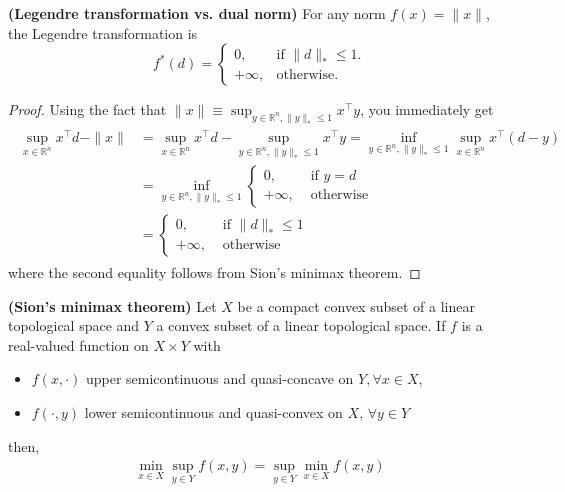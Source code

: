\documentclass{article}
\newcommand{\bfs}[1]{\textbf{({#1}) }}
\begin{document}
\begin{cora}\bfs{Legendre transformation vs. dual norm}\label{cor:nczeb}
For any norm $f(x) =\|x\|$,
the Legendre transformation  is 
\begin{equation}
  f^*(d)=\begin{cases}
    0, & \text{if $\|d\|_*\le 1$}.\\
    +\infty, & \text{otherwise}.
  \end{cases}
\end{equation}
\end{cora}
\begin{proof}\color{ForestGreen}
Using the fact that $\|x\| \equiv \sup _{y \in \mathbb{R}^{n},\|y\|_{*} \leq 1} x^{\top} y$, you immediately get
\begin{align*}
\begin{aligned}
\sup _{x \in \mathbb{R}^{n}} x^{\top} d-\|x\| &=\sup _{x \in \mathbb{R}^{n}} x^{\top} d-\sup _{y \in \mathbb{R}^{n},\|y\|_{*} \leq 1} x^{\top} y=\inf _{y \in \mathbb{R}^{n},\|y\|_{*} \leq 1} \sup _{x \in \mathbb{R}^{n}} x^{\top}(d-y) \\
&=\inf _{y \in \mathbb{R}^{n},\|y\|_{*} \leq 1} \begin{cases}0, & \text { if } y=d \\
+\infty, & \text { otherwise }\end{cases} \\
&= \begin{cases}0, & \text { if }\|d\|_{*} \leq 1 \\
+\infty, & \text { otherwise }\end{cases}
\end{aligned}
\end{align*}
where the second equality follows from Sion's minimax theorem.
\end{proof}
\begin{lema}\bfs{Sion's minimax theorem}\label{lem:guiozfc}
 Let $X$ be a compact convex subset of a linear topological space and $Y$ a convex subset of a linear topological space. If $f$ is a real-valued function on $X \times Y$ with
 \begin{itemize}
     \item $f(x, \cdot)$ upper semicontinuous and quasi-concave on $Y, \forall x \in X$, 
     \item $f(\cdot, y)$ lower semicontinuous and quasi-convex on $X$, $\forall y \in Y$
 \end{itemize}
then,
\begin{align*}
\min _{x \in X} \sup _{y \in Y} f(x, y)=\sup _{y \in Y} \min _{x \in X} f(x, y)
\end{align*}
\end{lema}
\end{document}
